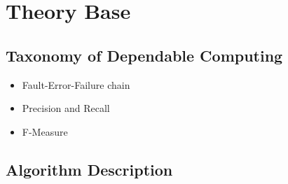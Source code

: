 \documentclass[12pt]{article} %
\begin{document}

\section{Theory Base} %


\subsection{Taxonomy of Dependable Computing} %
\begin{itemize} %
    \item Fault-Error-Failure chain \cite{IEEE04_Avizienis}
    \item Precision and Recall \cite{rijsbergen79}
    \item F-Measure \cite{DARPA99_Makhoul}
\end{itemize} 


\subsection{Algorithm Description} %
\end{document}
